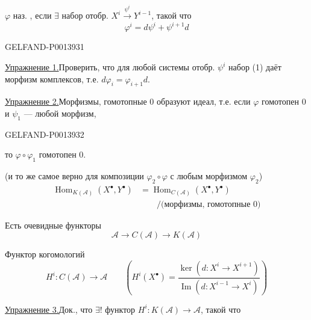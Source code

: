 \(\varphi\) наз. , если
\(\exists\) набор отобр. \(X^i\overset{\psi^i}{\longrightarrow}Y^{i-1}\),
такой что
\begin{equation*}
\varphi^i=d\psi^i+\psi^{i+1}d
\tag{1}
\end{equation*}


\begin{GelfandAdjacentEvidence}{GELFAND-P001393}{1}

\uline{Упражнение 1.}\quad Проверить, что для любой системы отобр. \(\psi^i\) набор (1)
даёт морфизм комплексов, т.е. \(d\varphi_i=\varphi_{i+1}d\).

\uline{Упражнение 2.}\quad Морфизмы, гомотопные \(0\) образуют идеал, т.е. если
\(\varphi\) гомотопен \(0\) и \(\psi_1\) --- любой морфизм,
\end{GelfandAdjacentEvidence}
\begin{GelfandAdjacentEvidence}{GELFAND-P001393}{2}

то \(\varphi\circ\varphi_1\) гомотопен \(0\).

(и то же самое верно для композиции \(\varphi_2\circ\varphi\) с любым морфизмом \(\varphi_2\))
\[
\begin{aligned}
\operatorname{Hom}_{K(\mathcal A)}(X^\bullet,Y^\bullet)
&=\operatorname{Hom}_{C(\mathcal A)}(X^\bullet,Y^\bullet)\\
&\qquad /\bigl(\text{морфизмы, гомотопные }0\bigr)
\end{aligned}
\]

Есть очевидные функторы
\[
\mathcal A\longrightarrow C(\mathcal A)\longrightarrow K(\mathcal A)
\]

Функтор когомологий
\[
H^i\colon C(\mathcal A)\longrightarrow\mathcal A\qquad
\left(H^i(X^\bullet)=
\frac{\ker(d\colon X^i\longrightarrow X^{i+1})}
{\operatorname{Im}(d\colon X^{i-1}\longrightarrow X^i)}\right)
\]

\uline{Упражнение 3.}\quad Док., что \(\exists!\) функтор
\(H^i\colon K(\mathcal A)\longrightarrow\mathcal A\), такой что
\end{GelfandAdjacentEvidence}
